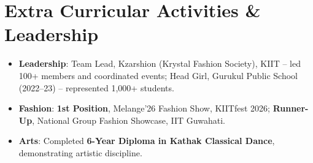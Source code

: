 \documentclass[a4paper,10pt]{article}
\begin{document}
\section{Extra Curricular Activities \& Leadership}
\begin{itemize}
    \item \textbf{Leadership}: Team Lead, Kzarshion (Krystal Fashion Society), KIIT -- led 100+ members and coordinated events; Head Girl, Gurukul Public School (2022--23) -- represented 1,000+ students.
    \item \textbf{Fashion}: \textbf{1st Position}, Melange'26 Fashion Show, KIITfest 2026; \textbf{Runner-Up}, National Group Fashion Showcase, IIT Guwahati.
    \item \textbf{Arts}: Completed \textbf{6-Year Diploma in Kathak Classical Dance}, demonstrating artistic discipline.
\end{itemize}
\end{document}
